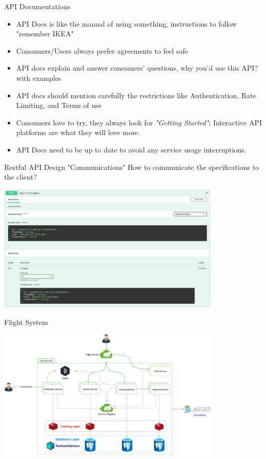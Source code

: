 \documentclass{beamer}
\begin{document}
\begin{frame}[t]{API Documentations}
		\begin{itemize}
			\item<1-> API Docs is like the manual of using something, instructions to follow "remember IKEA" 
			\item<2-> Consumers/Users always prefer agreements to feel safe
			\item<3-> API docs explain and answer consumers' questions, why you'd use this API? with examples
			\item<4-> API docs should mention carefully the restrictions like Authentication, Rate Limiting, and Terms of use
			\item<5-> Consumers love to try, they always look for \textit{"Getting Started"}; Interactive API platforms are what they will love more.
			\item<6-> API Docs need to be up to date to avoid any service usage interruptions.
		\end{itemize}		
	
\end{frame}


\begin{frame}[t]{Restful API Design "Communications"}
		\scriptsize	
		How to communicate the specifications to the client?

		\begin{center}
   			\includegraphics[width=0.8\textwidth, height=0.6\textheight]{img/swagger-doc.png}
		\end{center}		
	
\end{frame}

\begin{frame}[t]{Flight System}
		\begin{center}
   			\includegraphics[width=0.8\textwidth, height=0.8\textheight]{img/Flight-System.png}
		\end{center}	
\end{frame}
\end{document}
